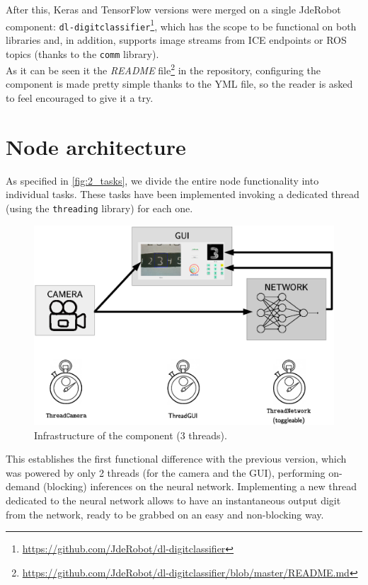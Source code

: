 		After this, Keras and TensorFlow versions were merged on a single JdeRobot component: \texttt{dl-digitclassifier}\footnote{\url{https://github.com/JdeRobot/dl-digitclassifier}}, which has the scope to be functional on both libraries and, in addition, supports image streams from ICE endpoints or ROS topics (thanks to the \texttt{comm} library).\\
		
		As it can be seen it the \emph{README} file\footnote{\url{https://github.com/JdeRobot/dl-digitclassifier/blob/master/README.md}} in the repository, configuring the component is made pretty simple thanks to the YML file, so the reader is asked to feel encouraged to give it a try.\\
		
	\section{Node architecture}
		As specified in \autoref{fig:2_tasks}, we divide the entire node functionality into individual tasks. These tasks have been implemented invoking a dedicated thread (using the \texttt{threading} library) for each one.\\
		
		\begin{figure}[h]
			\centering
			\includegraphics[width=5in]{images/digitclassifier_infrastructure}
			\caption{Infrastructure of the component (3 threads).}
			\label{fig:4_digitclassifier_infrastructure}
		\end{figure}
		
		
		
		This establishes the first functional difference with the previous version, which was powered by only 2 threads (for the camera and the GUI), performing on-demand (blocking) inferences on the neural network. Implementing a new thread dedicated to the neural network allows to have an instantaneous output digit from the network, ready to be grabbed on an easy and non-blocking way.\\
		
